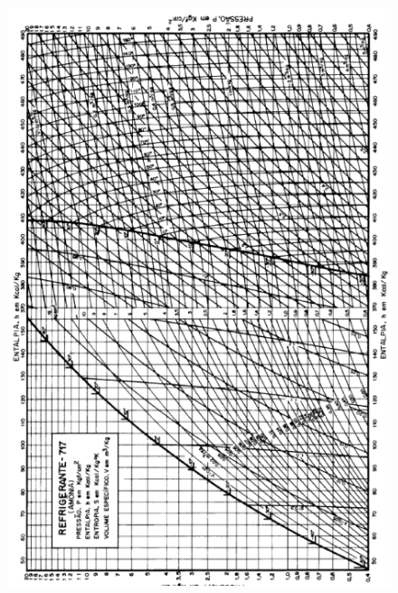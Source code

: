 \documentclass[
	12pt,				%
	openright,			%
	oneside,			%
	a4paper,			%
	english,			%
	french,				%
	spanish,			%
	brazil				%
	]{abntex2}
\begin{document}
\begin{anexosenv}
\begin{figure}[H]
\begin{center}
\includegraphics[scale=1.12]{../../Pictures/graficoamonia.png} 
\end{center}
\end{figure}


\end{anexosenv}
\end{document}
